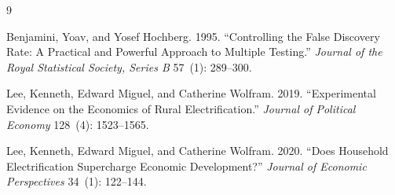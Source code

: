\documentclass[12pt]{article}
\begin{document}
\clearpage
\begin{singlespace}
\begin{thebibliography}{9}

Benjamini, Yoav, and Yosef Hochberg. 1995.
``Controlling the False Discovery Rate: A Practical and Powerful
Approach to Multiple Testing.''
\textit{Journal of the Royal Statistical Society, Series B}
57~(1): 289--300.

Lee, Kenneth, Edward Miguel, and Catherine Wolfram. 2019.
``Experimental Evidence on the Economics of Rural Electrification.''
\textit{Journal of Political Economy} 128~(4): 1523--1565.

Lee, Kenneth, Edward Miguel, and Catherine Wolfram. 2020.
``Does Household Electrification Supercharge Economic Development?''
\textit{Journal of Economic Perspectives} 34~(1): 122--144.

\end{thebibliography}
\end{singlespace}
\end{document}
